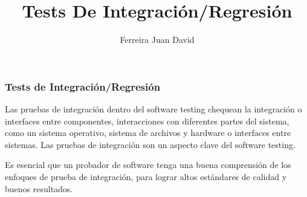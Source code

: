 \documentclass[xetex, 11pt,spanish]{beamer}
\theoremstyle{mystyle}
\begin{document}
\author{Ferreira Juan David}
	\title{Tests De Integración/Regresión}
	\subtitle{}
	\logo{}
	\institute{}
	\date{}
	\begin{frame}[plain]
		\maketitle
	\end{frame}
	\begin{frame}
		\frametitle{Tests de Integración/Regresión}
		Las pruebas de integración dentro del software testing chequean la integración o interfaces entre componentes, interacciones con diferentes partes del sistema, como un sistema operativo, sistema de archivos y hardware o interfaces entre sistemas. Las pruebas de integración son un aspecto clave del software testing.
		
		Es esencial que un probador de software tenga una buena comprensión de los enfoques de prueba de integración, para lograr altos estándares de calidad y buenos resultados. 
	\end{frame}

	
	
	
	
	

	
	
\end{document}
